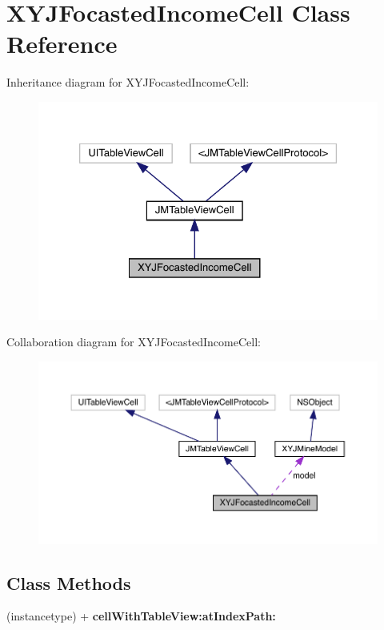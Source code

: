 \hypertarget{interface_x_y_j_focasted_income_cell}{}\section{X\+Y\+J\+Focasted\+Income\+Cell Class Reference}
\label{interface_x_y_j_focasted_income_cell}


Inheritance diagram for X\+Y\+J\+Focasted\+Income\+Cell\+:\nopagebreak
\begin{figure}[H]
\begin{center}
\leavevmode
\includegraphics[width=326pt]{interface_x_y_j_focasted_income_cell__inherit__graph}
\end{center}
\end{figure}


Collaboration diagram for X\+Y\+J\+Focasted\+Income\+Cell\+:\nopagebreak
\begin{figure}[H]
\begin{center}
\leavevmode
\includegraphics[width=350pt]{interface_x_y_j_focasted_income_cell__coll__graph}
\end{center}
\end{figure}
\subsection*{Class Methods}
\begin{DoxyCompactItemize}
\item 
\mbox{\label{interface_x_y_j_focasted_income_cell_aa18c51d04e0241389343ebdb41b0f02b}} 
(instancetype) + {\bfseries cell\+With\+Table\+View\+:at\+Index\+Path\+:}
\end{DoxyCompactItemize}

